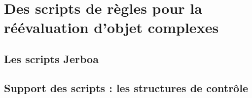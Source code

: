 
\chapter[Des scripts de règles pour la réévaluation d'objets complexes]{Des scripts de règles pour la réévaluation d'objet complexes}
\label{cha:script-regles-reevaluation-objets-complexes}

\section[Les scripts Jerboa]{Les scripts Jerboa}
\label{sec:scripts-jerboa}

\section[Support des scripts : les structures de contrôle]{Support des scripts : les structures de contrôle}
\label{sec:support-scripts-structures-controle}

